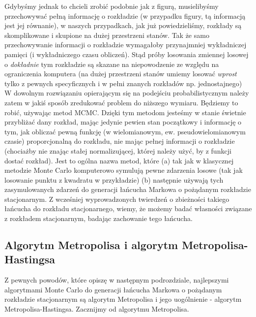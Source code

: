 \documentclass[a4paper]{article}
\theoremstyle{defn}
\theoremstyle{theorem}
\theoremstyle{lemma}
\theoremstyle{cor}
\theoremstyle{fact}
\begin{document}
Gdybyśmy jednak to chcieli zrobić podobnie jak z figurą, musielibyśmy przechowywać pełną informację o rozkładzie (w przypadku figury, tą informacją jest jej równanie), w naszych przypadkach, jak już powiedzieliśmy, rozkłady są skomplikowane i skupione na dużej przestrzeni stanów. Tak że samo przechowywanie informacji o rozkładzie  wymagałoby przynajmniej wykładniczej pamięci (i wykładniczego czasu obliczeń). Stąd próby losowania zmiennej losowej o \textit{dokładnie} tym rozkładzie są skazane na niepowodzenie ze względu na ograniczenia komputera (na dużej przestrzeni stanów umiemy losować \textit{wprost} tylko z pewnych specyficznych i w pełni znanych rozkładów np. jednostajnego)\\
W dowolnym rozwiązaniu opierającym się na podejściu probabilistycznym należy zatem w jakiś sposób zredukować problem do niższego wymiaru. Będziemy to robić, używając metod MCMC. Dzięki tym metodom jesteśmy w stanie świetnie przybliżać dany rozkład, mając jedynie pewien stan początkowy i informację o tym, jak obliczać pewną funkcję (w wielomianowym, ew. pseudowielomianowym czasie) proporcjonalną do rozkładu, nie mając pełnej informacji o rozkładzie (chociażby nie znając stałej normalizującej, której należy użyć, by z funkcji dostać rozkład). Jest to ogólna nazwa metod, które (a) tak jak w klasycznej metodzie Monte Carlo komputerowo symulują pewne zdarzenia losowe (tak jak losowanie punktu z kwadratu w przykładzie) (b) następnie używają tych zasymulowanych zdarzeń do generacji łańcucha Markowa o pożądanym rozkładzie stacjonarnym. Z wcześniej wyprowadzonych twierdzeń o zbieżności takiego łańcucha do rozkładu stacjonarnego, wiemy, że możemy badać własności związane z rozkładem stacjonarnym, badając zachowanie tego łańcucha.


\subsection{Algorytm Metropolisa i algorytm Metropolisa-Hastingsa}
\label{sect3.2}
Z pewnych powodów, które opiszę w następnym podrozdziale, najlepszymi algorytmami Monte Carlo do generacji łańcucha Markowa o pożądanym rozkładzie stacjonarnym są algorytm Metropolisa i jego uogólnienie - algorytm Metropolisa-Hastingsa. Zacznijmy od algorytmu Metropolisa.\\
\end{document}
